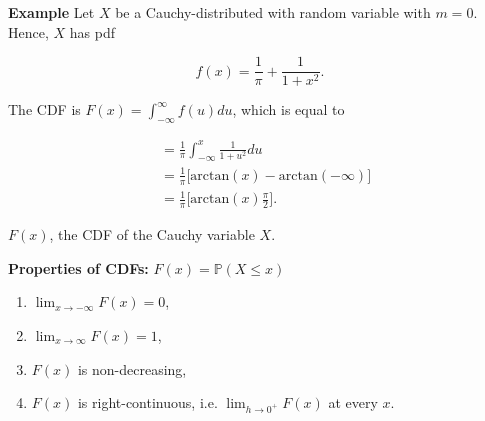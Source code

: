 \documentclass[12pt]{article}
\newcommand{\prob}[1]{\mathbb{P}(#1)}
\begin{document}
\begin{tcolorbox}
\textbf{Example} Let $X$ be a Cauchy-distributed with random variable with $m = 0$. Hence, $X$ has pdf

\begin{equation*}
f(x) = \frac{1}{\pi} + \frac{1}{1 + x^2}.
\end{equation*}

\noindent
The CDF is $F(x) = \int_{- \infty}^{\infty} f(u) du$, which is equal to 

\begin{align*}
& = \frac{1}{\pi} \int_{- \infty}^{x} \frac{1}{1+u^2} du \\
& = \frac{1}{\pi} \big [ \text{arctan}(x) - \text{arctan}(-\infty) \big ] \\
& = \frac{1}{\pi} \big [ \text{arctan}(x) \frac{\pi}{2} \big ].
\end{align*}

\noindent
$F(x)$, the CDF of the Cauchy variable $X$.

\end{tcolorbox}

\noindent
\textbf{Properties of CDFs:} $F(x) = \prob{X \leq x}$

\begin{enumerate}
\item $\lim_{x \rightarrow - \infty} F(x) = 0$,
\item $\lim_{x \rightarrow \infty} F(x) = 1$,
\item $F(x)$ is non-decreasing,
\item $F(x)$ is right-continuous, i.e. $\lim_{h \rightarrow 0^{+}} F(x)$ at every $x$.
\end{enumerate}
\end{document}

